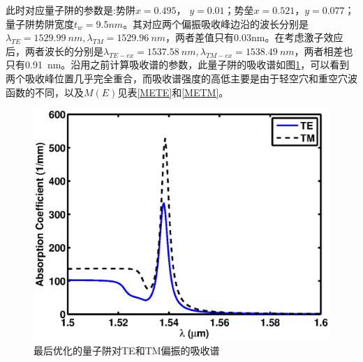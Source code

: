 此时对应量子阱的参数是:势阱$x = 0.495$， $y  = 0.01$；势垒$x = 0.521$，$y = 0.077$；量子阱势阱宽度$t_w = 9.5 nm$。其对应两个偏振吸收峰边沿的波长分别是$ \lambda_{TE} =1529.99~ nm, \lambda_{TM} =  1529.96 ~nm$，两者差值只有0.03nm。在考虑激子效应后，两者波长的分别是$ \lambda_{TE-ex} =1537.58~ nm, \lambda_{TM-ex} =  1538.49~ nm$，两者相差也只有0.91~nm。沿用之前计算吸收谱的参数，此量子阱的吸收谱如图\ref{fig_ch2_opt_abs_tetm}，可以看到两个吸收峰位置几乎完全重合，而吸收谱强度的高低主要是由于轻空穴和重空穴波函数的不同，以及$M(E)$见表\ref{METE}和\ref{METM}。
\begin{figure}[htb]
	\centering
	\includegraphics[width=12cm]{./Pictures/fig_ch2_opt_abs_tetm.eps}
	\caption{最后优化的量子阱对TE和TM偏振的吸收谱}
	\label{fig_ch2_opt_abs_tetm}
\end{figure}

